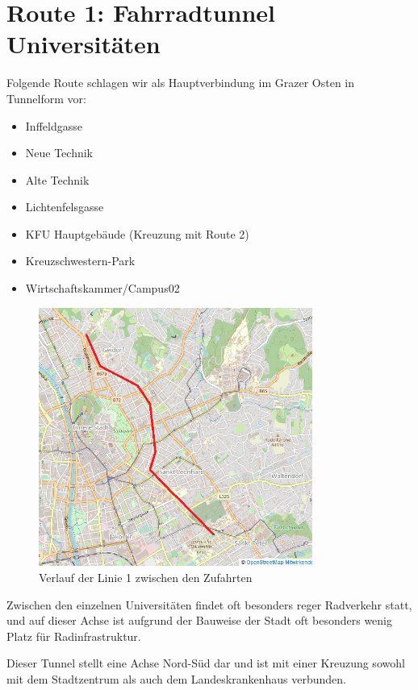 \section{Route 1: Fahrradtunnel Universitäten}
Folgende Route schlagen wir als Hauptverbindung im Grazer Osten in Tunnelform vor:

\begin{itemize}
    \item Inffeldgasse
    \item Neue Technik
    \item Alte Technik
    \item Lichtenfelsgasse
    \item KFU Hauptgebäude (Kreuzung mit Route 2)
    \item Kreuzschwestern-Park
    \item Wirtschaftskammer/Campus02
\end{itemize}

\begin{figure}
    \includegraphics[width=0.8\textwidth]{main/bike/tunnel/uni/linie1}
    \centering
    \caption[Verlauf Linie 1]{Verlauf der Linie 1 zwischen den Zufahrten}
\end{figure}

Zwischen den einzelnen Universitäten findet oft besonders reger Radverkehr statt, und auf dieser Achse ist aufgrund der Bauweise der Stadt oft besonders wenig Platz für Radinfrastruktur.

Dieser Tunnel stellt eine Achse Nord-Süd dar und ist mit einer Kreuzung sowohl mit dem Stadtzentrum als auch dem Landeskrankenhaus verbunden.

